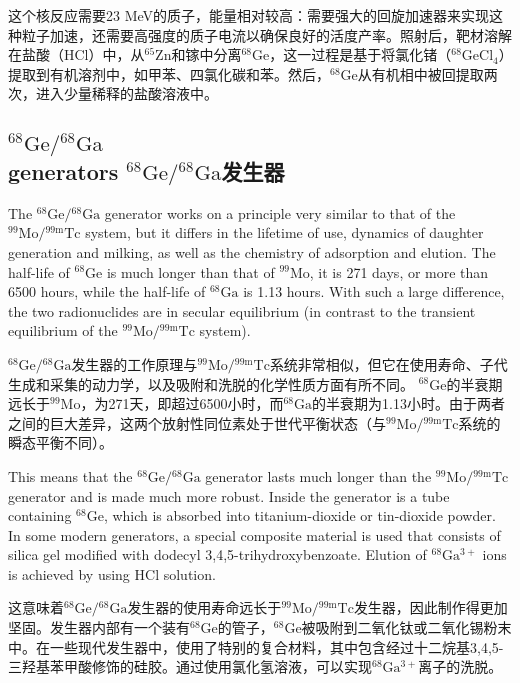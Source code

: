 \documentclass[dvipsnames, svgnames,a4paper,11pt]{article}
\begin{document}
这个核反应需要23 MeV的质子，能量相对较高：需要强大的回旋加速器来实现这种粒子加速，还需要高强度的质子电流以确保良好的活度产率。照射后，靶材溶解在盐酸（HCl）中，从\(\mathrm{^{65}Zn}\)和镓中分离\(\mathrm{^{68}Ge}\)，这一过程是基于将氯化锗（\(\mathrm{^{68}GeCl_4}\)）提取到有机溶剂中，如甲苯、四氯化碳和苯。然后，\(\mathrm{^{68}Ge}\)从有机相中被回提取两次，进入少量稀释的盐酸溶液中。

\subsection{\(\mathrm{^{68}Ge}/\mathrm{^{68}Ga}\)\\ generators \(\mathrm{^{68}Ge}/\mathrm{^{68}Ga}\)发生器}  
The \(\mathrm{^{68}Ge}/\mathrm{^{68}Ga}\) generator works on a principle very similar to that of the \(\mathrm{^{99}Mo}/\mathrm{^{99m}Tc}\) system, but it differs in the lifetime of use, dynamics of daughter generation and milking, as well as the chemistry of adsorption and elution. The half-life of \(\mathrm{^{68}Ge}\) is much longer than that of \(\mathrm{^{99}Mo}\), it is 271 days, or more than 6500 hours, while the half-life of \(\mathrm{^{68}Ga}\) is 1.13 hours. With such a large difference, the two radionuclides are in secular equilibrium (in contrast to the transient equilibrium of the \(\mathrm{^{99}Mo}/\mathrm{^{99m}Tc}\) system).  

\(\mathrm{^{68}Ge}/\mathrm{^{68}Ga}\)发生器的工作原理与\(\mathrm{^{99}Mo}/\mathrm{^{99m}Tc}\)系统非常相似，但它在使用寿命、子代生成和采集的动力学，以及吸附和洗脱的化学性质方面有所不同。 \(\mathrm{^{68}Ge}\)的半衰期远长于\(\mathrm{^{99}Mo}\)，为271天，即超过6500小时，而\(\mathrm{^{68}Ga}\)的半衰期为1.13小时。由于两者之间的巨大差异，这两个放射性同位素处于世代平衡状态（与\(\mathrm{^{99}Mo}/\mathrm{^{99m}Tc}\)系统的瞬态平衡不同）。  

This means that the \(\mathrm{^{68}Ge}/\mathrm{^{68}Ga}\) generator lasts much longer than the \(\mathrm{^{99}Mo}/\mathrm{^{99m}Tc}\) generator and is made much more robust. Inside the generator is a tube containing \(\mathrm{^{68}Ge}\), which is absorbed into titanium-dioxide or tin-dioxide powder. In some modern generators, a special composite material is used that consists of silica gel modified with dodecyl 3,4,5-trihydroxybenzoate. Elution of \(\mathrm{^{68}Ga^{3+}}\) ions is achieved by using HCl solution.  

这意味着\(\mathrm{^{68}Ge}/\mathrm{^{68}Ga}\)发生器的使用寿命远长于\(\mathrm{^{99}Mo}/\mathrm{^{99m}Tc}\)发生器，因此制作得更加坚固。发生器内部有一个装有\(\mathrm{^{68}Ge}\)的管子，\(\mathrm{^{68}Ge}\)被吸附到二氧化钛或二氧化锡粉末中。在一些现代发生器中，使用了特别的复合材料，其中包含经过十二烷基3,4,5-三羟基苯甲酸修饰的硅胶。通过使用氯化氢溶液，可以实现\(\mathrm{^{68}Ga^{3+}}\)离子的洗脱。  
\end{document}
